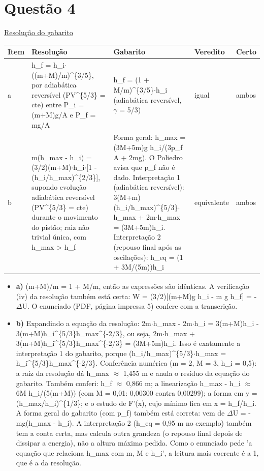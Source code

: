 \documentclass{article}%
\begin{document}
\section*{Questão 4}%
\href{https://poliedroresolve.sistemapoliedro.com.br/vestibulares/ita/2027/ita-2-fase-dia-3-22-10-2026-2-fase-dia-3/dissertativa-4-fisica-2-fase-dia-3-ita-2027}{Resolução do gabarito}\par\smallskip%
\begin{longtable}{@{}p{} p{} p{} p{} p{}@{}}\toprule Item & Resolução & Gabarito & Veredito & Certo \\ \midrule
a & h\_f = h\_i$\cdot$((m+M)/m)\^{}\{3/5\}, por adiabática reversível (PV\^{}\{5/3\} = cte) entre P\_i = (m+M)g/A e P\_f = mg/A & h\_f = (1 + M/m)\^{}\{3/5\}$\cdot$h\_i (adiabática reversível, $\gamma$ = 5/3) & igual & ambos \\
b & m(h\_max - h\_i) = (3/2)(m+M)$\cdot$h\_i$\cdot${[}1 - (h\_i/h\_max)\^{}\{2/3\}{]}, supondo evolução adiabática reversível (PV\^{}\{5/3\} = cte) durante o movimento do pistão; raiz não trivial única, com h\_max > h\_f & Forma geral: h\_max = (3M+5m)g h\_i/(3p\_f A + 2mg). O Poliedro avisa que p\_f não é dado. Interpretação 1 (adiabática reversível): 3(M+m)(h\_i/h\_max)\^{}\{5/3\}$\cdot$h\_max + 2m$\cdot$h\_max = (3M+5m)h\_i. Interpretação 2 (repouso final após as oscilações): h\_eq = (1 + 3M/(5m))h\_i & equivalente & ambos \\
\bottomrule\end{longtable}%
\begin{itemize}%
\item%
\textbf{a)} (m+M)/m = 1 + M/m, então as expressões são idênticas. A verificação (iv) da resolução também está certa: W = (3/2){[}(m+M)g h\_i - m g h\_f{]} = -$\Delta$U. O enunciado (PDF, página impressa 5) confere com a transcrição.%
\item%
\textbf{b)} Expandindo a equação da resolução: 2m$\cdot$h\_max - 2m$\cdot$h\_i = 3(m+M)h\_i - 3(m+M)h\_i\^{}\{5/3\}h\_max\^{}\{-2/3\}, ou seja, 2m$\cdot$h\_max + 3(m+M)h\_i\^{}\{5/3\}h\_max\^{}\{-2/3\} = (3M+5m)h\_i. Isso é exatamente a interpretação 1 do gabarito, porque (h\_i/h\_max)\^{}\{5/3\}$\cdot$h\_max = h\_i\^{}\{5/3\}h\_max\^{}\{-2/3\}. Conferência numérica (m = 2, M = 3, h\_i = 0,5): a raiz da resolução dá h\_max $\approx$ 1,455 m e anula o resíduo da equação do gabarito. Também conferi: h\_f $\approx$ 0,866 m; a linearização h\_max - h\_i $\approx$ 6M h\_i/(5(m+M)) (com M = 0,01: 0,00300 contra 0,00299); a forma em y = (h\_max/h\_i)\^{}\{1/3\}; e o estudo de F'(x), cujo mínimo fica em x = h\_f/h\_i. A forma geral do gabarito (com p\_f) também está correta: vem de $\Delta$U = -mg(h\_max - h\_i). A interpretação 2 (h\_eq = 0,95 m no exemplo) também tem a conta certa, mas calcula outra grandeza (o repouso final depois de dissipar a energia), não a altura máxima pedida. Como o enunciado pede 'a equação que relaciona h\_max com m, M e h\_i', a leitura mais coerente é a 1, que é a da resolução.%
\end{itemize}%
\end{document}
